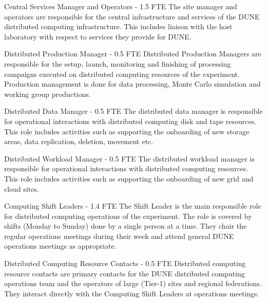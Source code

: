 \begin{description}
\item {Central Services Manager and Operators - 1.5 FTE}
The site manager and operators are responsible for the central infrastructure and services of the DUNE distributed computing infrastructure. This includes liaison with the host laboratory with respect to services they provide for DUNE. %

\item {Distributed Production Manager - 0.5 FTE}
Distributed Production Managers are responsible for the setup, launch, monitoring and finishing of processing campaigns executed on distributed computing resources of the experiment. Production management is done for data processing, Monte Carlo simulation and working group productions.%

\item {Distributed Data Manager - 0.5 FTE}
The distributed data manager is responsible for operational interactions with distributed computing disk and tape resources. This role includes activities such as supporting the onboarding of new storage areas, data replication, deletion, movement etc. %

\item {Distributed Workload Manager - 0.5 FTE}
The distributed workload manager is responsible for operational interactions with distributed computing resources. This role includes activities such as supporting the onboarding of new grid and cloud sites. %



\item {Computing Shift Leaders - 1.4 FTE}
The Shift Leader is the main responsible role for distributed computing operations of the experiment. The role is covered by shifts (Monday to Sunday) done by a single person at a time.  They chair the regular operations meetings during their week and attend general DUNE operations meetings as appropriate. %

\item {Distributed Computing Resource Contacts - 0.5 FTE}
Distributed computing resource contacts are primary contacts for the DUNE distributed computing operations team and the operators of large (Tier-1) sites and regional federations. They interact directly with the Computing Shift Leaders at operations meetings. %


\end{description}

